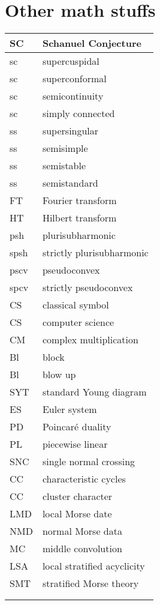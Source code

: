 \documentclass{amsart}
\numberwithin{equation}{section}
\theoremstyle{plain}
\numberwithin{equation}{section}
\theoremstyle{remark}
\begin{document}
\section{Other math stuffs}
\begin{longtable}{l|l}
\hline
SC & Schanuel Conjecture \\ \hline
sc & supercuspidal\\ \hline
sc & superconformal\\ \hline
sc & semicontinuity\\ \hline
sc & simply connected\\ \hline
ss & supersingular\\ \hline
ss & semisimple\\ \hline
ss & semistable\\ \hline
ss & semistandard\\ \hline
FT & Fourier transform\\ \hline
HT & Hilbert transform\\ \hline
psh & plurisubharmonic\\ \hline
spsh & strictly plurisubharmonic\\ \hline
pscv & pseudoconvex\\ \hline
spcv & strictly pseudoconvex\\ \hline 
CS & classical symbol\\ \hline
CS & computer science\\ \hline
CM & complex multiplication\\ \hline
Bl  & block\\ \hline
Bl  & blow up\\ \hline
SYT  & standard Young diagram\\ \hline
ES  & Euler system\\ \hline
PD & Poincaré duality\\ \hline
PL & piecewise linear\\ \hline
SNC & single normal crossing\\ \hline
CC & characteristic cycles\\ \hline
CC & cluster character\\ \hline
LMD & local Morse date\\ \hline
NMD & normal Morse data\\ \hline
MC & middle convolution\\ \hline
LSA & local stratified acyclicity\\ \hline
SMT & stratified Morse theory\\ \hline
 & \\ \hline
 & \\ \hline

\end{longtable}
\end{document}
